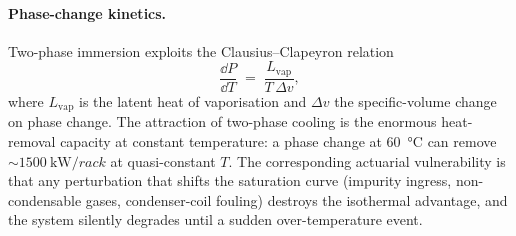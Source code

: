 \begin{table}[ht]
\centering\footnotesize
\caption{Comparison of cooling fluid families relevant to data center
immersion and direct-to-chip cooling. Values are nominal; consult
manufacturer datasheets for binding numbers.}\label{tab:fluids}
\setlength{\tabcolsep}{4pt}
\end{table}

\paragraph{Phase-change kinetics.}
Two-phase immersion exploits the Clausius--Clapeyron relation
\begin{equation}\label{eq:CC}
   \frac{\dd P}{\dd T} \;=\; \frac{L_{\mathrm{vap}}}{T\,\Delta v},
\end{equation}
where $L_{\mathrm{vap}}$ is the latent heat of vaporisation and
$\Delta v$ the specific-volume change on phase change. The
attraction of two-phase cooling is the enormous heat-removal capacity
at constant temperature: a phase change at \SI{60}{\celsius} can
remove $\sim\SI{1500}{\kilo\watt\per rack}$ at quasi-constant
$T$. The corresponding actuarial vulnerability is that any
perturbation that shifts the saturation curve (impurity ingress,
non-condensable gases, condenser-coil fouling) destroys the
isothermal advantage, and the system silently degrades until a
sudden over-temperature event.

